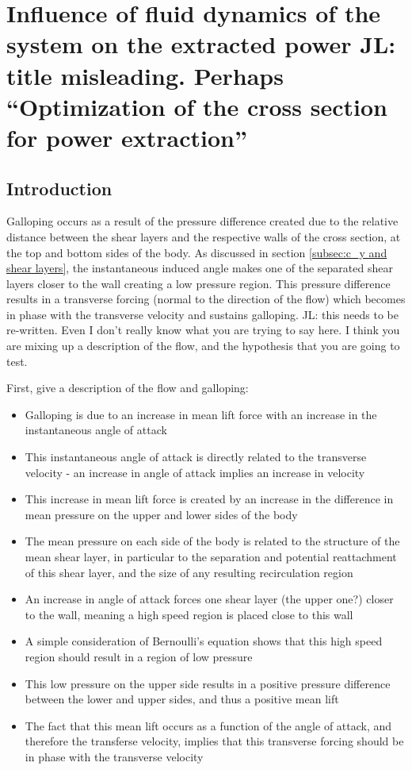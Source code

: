 \chapter{Influence of fluid dynamics of the system on the extracted power JL: title misleading. Perhaps ``Optimization of the cross section for power extraction''}

\section{Introduction}

Galloping occurs as a result of the pressure difference created due to the relative distance between the shear layers and the respective walls of the cross section, at the top and bottom sides of the body. As discussed in section \ref{subsec:c_y and shear layers}, the instantaneous induced angle makes one of the separated shear layers closer to the wall creating a low pressure region. This pressure difference results in a transverse forcing (normal to the direction of the flow) which becomes in phase with the transverse velocity and sustains galloping.  JL: this needs to be re-written. Even I don't really know what you are trying to say here. I think you are mixing up a description of the flow, and the hypothesis that you are going to test.

First, give a description of the flow and galloping:
\begin{itemize}
\item Galloping is due to an increase in mean lift force with an
  increase in the instantaneous angle of attack
\item This instantaneous angle of attack is directly related to the
  transverse velocity - an increase in angle of attack implies an
  increase in velocity
\item This increase in mean lift force is created by an increase in
  the difference in mean pressure on the upper and lower sides of the
  body
\item The mean pressure on each side of the body is related to the
  structure of the mean shear layer, in particular to the separation
  and potential reattachment of this shear layer, and the size of any
  resulting recirculation region
\item An increase in angle of attack forces one shear layer (the upper
  one?) closer to the wall, meaning a high speed region is placed
  close to this wall
\item A simple consideration of Bernoulli's equation shows that this
  high speed region should result in a region of low pressure
\item This low pressure on the upper side results in a positive
  pressure difference between the lower and upper sides, and thus a
  positive mean lift
\item The fact that this mean lift occurs as a function of the angle
  of attack, and therefore the transferse velocity, implies that this
  transverse forcing should be in phase with the transverse velocity
\end{itemize}

